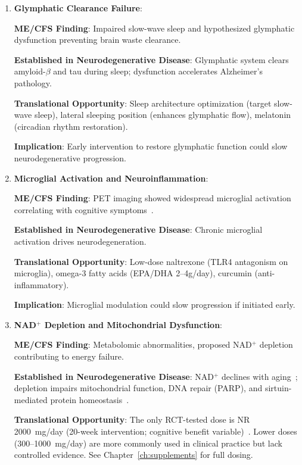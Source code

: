 \begin{enumerate}
    \item \textbf{Glymphatic Clearance Failure}:

    \textbf{ME/CFS Finding}: Impaired slow-wave sleep and hypothesized glymphatic dysfunction preventing brain waste clearance.

    \textbf{Established in Neurodegenerative Disease}: Glymphatic system clears amyloid-$\beta$ and tau during sleep; dysfunction accelerates Alzheimer's pathology.

    \textbf{Translational Opportunity}: Sleep architecture optimization (target slow-wave sleep), lateral sleeping position (enhances glymphatic flow), melatonin (circadian rhythm restoration).

    \textbf{Implication}: Early intervention to restore glymphatic function could slow neurodegenerative progression.

    \item \textbf{Microglial Activation and Neuroinflammation}:

    \textbf{ME/CFS Finding}: PET imaging showed widespread microglial activation correlating with cognitive symptoms~\cite{Nakatomi2014neuroinflammation}.

    \textbf{Established in Neurodegenerative Disease}: Chronic microglial activation drives neurodegeneration.

    \textbf{Translational Opportunity}: Low-dose naltrexone (TLR4 antagonism on microglia), omega-3 fatty acids (EPA/DHA 2--4g/day), curcumin (anti-inflammatory).

    \textbf{Implication}: Microglial modulation could slow progression if initiated early.

    \item \textbf{NAD$^+$ Depletion and Mitochondrial Dysfunction}:

    \textbf{ME/CFS Finding}: Metabolomic abnormalities, proposed NAD$^+$ depletion contributing to energy failure.

    \textbf{Established in Neurodegenerative Disease}: NAD$^+$ declines with aging~\cite{Massudi2012nad}; depletion impairs mitochondrial function, DNA repair (PARP), and sirtuin-mediated protein homeostasis~\cite{Dehhaghi2022AD}.

    \textbf{Translational Opportunity}: The only RCT-tested dose is NR 2000~mg/day (20-week intervention; cognitive benefit variable)~\cite{Wu2025NRLongCOVID}. Lower doses (300--1000~mg/day) are more commonly used in clinical practice but lack controlled evidence. See Chapter~\ref{ch:supplements} for full dosing.


\end{enumerate}
